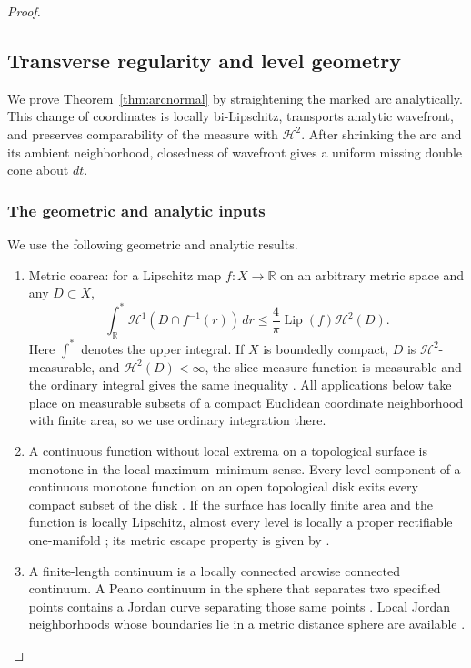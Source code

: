 \documentclass[11pt]{article}
\newcommand{\R}{\mathbb R}
\newcommand{\HH}{\mathcal H}
\begin{document}
\begin{proof}\leavevmode\par
\subsection{Transverse regularity and level geometry}

We prove Theorem~\ref{thm:arcnormal} by straightening the marked arc analytically. This change of coordinates is locally bi-Lipschitz, transports analytic wavefront, and preserves comparability of the measure with $\HH^2$. After shrinking the arc and its ambient neighborhood, closedness of wavefront gives a uniform missing double cone about $dt$.

\subsubsection{The geometric and analytic inputs}
We use the following geometric and analytic results.
\begin{enumerate}
\item Metric coarea: for a Lipschitz map $f:X\to\R$ on an arbitrary metric space and any $D\subset X$,
\begin{equation}\label{metriccoarea}
 \int_{\R}^{*}\HH^1(D\cap f^{-1}(r))\,dr
 \le \frac{4}{\pi}\operatorname{Lip}(f)\HH^2(D).
\end{equation}
Here $\int^{*}$ denotes the upper integral. If $X$ is boundedly compact, $D$ is $\HH^2$-measurable, and $\HH^2(D)<\infty$, the slice-measure function is measurable and the ordinary integral gives the same inequality \cite[Theorem 1.1]{EH}. All applications below take place on measurable subsets of a compact Euclidean coordinate neighborhood with finite area, so we use ordinary integration there.
\item A continuous function without local extrema on a topological surface is monotone in the local maximum--minimum sense. Every level component of a continuous monotone function on an open topological disk exits every compact subset of the disk \cite[Corollary 2.8]{Ntalam}. If the surface has locally finite area and the function is locally Lipschitz, almost every level is locally a proper rectifiable one-manifold \cite[Corollary 1.11]{EIR}; its metric escape property is given by \cite[Proposition 3.7]{EIR}.
\item A finite-length continuum is a locally connected arcwise connected continuum. A Peano continuum in the sphere that separates two specified points contains a Jordan curve separating those same points \cite[Lemmas 2.6--2.7]{EIR}. Local Jordan neighborhoods whose boundaries lie in a metric distance sphere are available \cite[Lemma 3.3]{EIR}.

\end{enumerate}
\end{proof}
\end{document}
